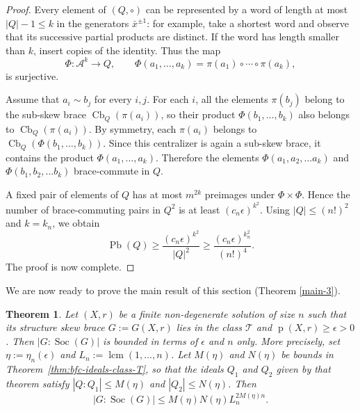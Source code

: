 \documentclass[10pt,a4paper]{amsart}
\numberwithin{equation}{section}
\newtheorem{thm}[equation]{Theorem}
\newcommand{\Cb}{\operatorname{Cb} }
\newcommand{\Pb}{\operatorname{Pb} }
\newcommand{\Soc}{\operatorname{Soc} }
\begin{document}
\begin{proof}
Every element of $(Q,\circ)$ can be represented by a word of length at most
$|Q|-1\leqslant k$ in the generators $\bar x^{\pm1}$: for example, take a
shortest word and observe that its successive partial products are distinct.
If the word has length smaller than $k$, insert copies of the identity.
Thus the map
$$
\Phi:\mathcal A^k\longrightarrow Q,\qquad
\Phi(a_1,\ldots,a_k)=\pi(a_1)\circ\cdots\circ\pi(a_k),
$$
is surjective.

Assume that $a_i\sim b_j$ for every $i,j$. For each $i$, all the elements
$\pi(b_j)$ belong to the sub-skew brace $\Cb_Q(\pi(a_i))$, so their product
$\Phi(b_1,\ldots,b_k)$ also belongs to $\Cb_Q(\pi(a_i))$. By symmetry,
each $\pi(a_i)$ belongs to
$\Cb_Q(\Phi(b_1,\ldots,b_k))$. Since this centralizer is again a sub-skew
brace, it contains the product $\Phi(a_1,\ldots,a_k)$. Therefore the elements $\Phi(a_1, a_2, \ldots a_k)$ and $\Phi(b_1, b_2, \ldots b_k)$  brace-commute in $Q$.

A fixed pair of elements of $Q$ has at most $m^{2k}$ preimages under
$\Phi\times\Phi$. Hence the number of brace-commuting pairs in $Q^2$ is at
least $(c_n\epsilon)^{k^2}$. Using $|Q|\leqslant(n!)^2$ and $k=k_n$, we obtain
$$
\Pb(Q)\geqslant\frac{(c_n\epsilon)^{k^2}}{|Q|^2}
\geqslant\frac{(c_n\epsilon)^{k_n^2}}{(n!)^4}.
$$
The proof is now complete.
\end{proof}

We are now ready to prove the main result of this section (Theorem \ref{main-3}).


 \begin{thm} %
Let $(X,r)$ be a finite non-degenerate solution of size $n$ such that its structure skew brace $G:=G(X,r)$ lies in the class $\mathcal{T}$  and 
$\operatorname{p}(X,r)\geqslant\epsilon>0$. Then
$|G:\Soc(G)|$ is bounded in terms of $\epsilon$ and $n$ only.
More precisely, set $\eta :=\eta_n(\epsilon)$ and
$L_n :=\operatorname{lcm}(1,\ldots,n)$. Let $M(\eta)$ and $N(\eta)$ be bounds
in Theorem~\ref{thm:bfc-ideals-class-T}, so that the ideals $Q_1$ and $Q_2$ given
by that theorem satisfy $|Q:Q_1|\leqslant M(\eta)$ and
$|Q_2|\leqslant N(\eta)$. Then
$$
|G :\Soc(G)|
\leqslant M(\eta)N(\eta)L_n^{2M(\eta)n}.
$$ 
\end{thm}
\end{document}
